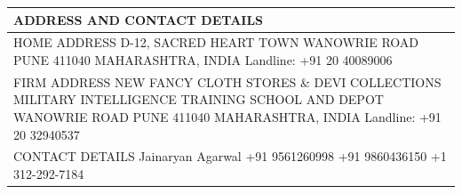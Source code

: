 \documentclass[a4paper,8pt]{extarticle}
\newcommand{\redfont}[1]{%
	{\color{textred}%
	\fontspec{Fjalla One}%
	\fontsize{14pt}{18pt}%
	\selectfont #1}}
\begin{document}
\bigskip
\begin{tabularx}{\linewidth}{X}
\large ADDRESS AND CONTACT DETAILS	\\\toprule
\redfont{HOME ADDRESS}\newline
D-12, SACRED HEART TOWN \newline
WANOWRIE ROAD \newline
PUNE 411040 \newline
MAHARASHTRA, INDIA \newline
Landline: +91 20 40089006 \\
\redfont{FIRM ADDRESS}\newline
NEW FANCY CLOTH STORES \& DEVI COLLECTIONS \newline
MILITARY INTELLIGENCE TRAINING SCHOOL AND DEPOT \newline
WANOWRIE ROAD \newline
PUNE 411040 \newline
MAHARASHTRA, INDIA \newline
Landline: +91 20 32940537 \\
\redfont{CONTACT DETAILS}\newline
Jainaryan Agarwal \newline
+91 9561260998 \newline 
+91 9860436150 \newline 
+1 312-292-7184 \\
\end{tabularx}\\
\end{document}
